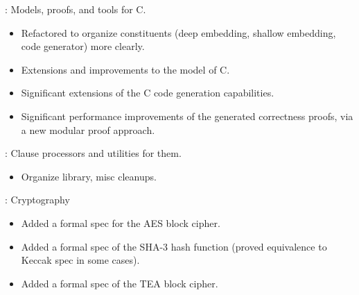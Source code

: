 \begin{frame}

\implibtitle

:
Models, proofs, and tools for C.
\begin{itemize}
\item Refactored to organize constituents
      (deep embedding, shallow embedding, code generator)
      more clearly.
\item Extensions and improvements to the model of C.
\item Significant extensions of the C code generation capabilities.
\item Significant performance improvements of the generated correctness proofs,
      via a new modular proof approach.
\end{itemize}

\end{frame}


\begin{frame}

\implibtitle

:
Clause processors and utilities for them.
\begin{itemize}
\item Organize library, misc cleanups.
\end{itemize}

\end{frame}


\begin{frame}

\implibtitle

:
Cryptography
\begin{itemize}
\item Added a formal spec for the AES block cipher.
\item Added a formal spec of the SHA-3 hash function (proved equivalence to Keccak spec in some cases).
\item Added a formal spec of the TEA block cipher.
\end{itemize}

\end{frame}


